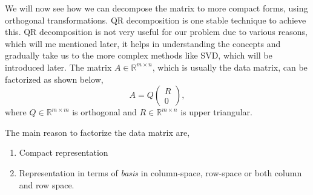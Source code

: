We will now see how we can decompose the matrix to more compact forms, using
orthogonal transformations. QR decomposition is one stable technique to achieve
this. QR decomposition is not very useful for our problem due to various
reasons, which will me mentioned later, it helps in understanding the concepts
and gradually take us to the more complex methods like SVD, which will be
introduced later. The matrix $A\in \mathbb{R}^{m\times n}$, which is usually the
data matrix, can be factorized as shown below,
\[
 A = Q\left(\begin{array}{ccc}
		R \\
               0  \end{array}\right), 
\]	
where $Q \in \mathbb{R}^{m \times m}$ is orthogonal and $R \in \mathbb{R}^{m
\times n}$ is upper triangular. 

The main reason to factorize the data matrix are, 
\begin{enumerate}
 \item Compact representation
 \item Representation in terms of \emph{basis} in column-space, row-space or
both column and row space. 
\end{enumerate}

